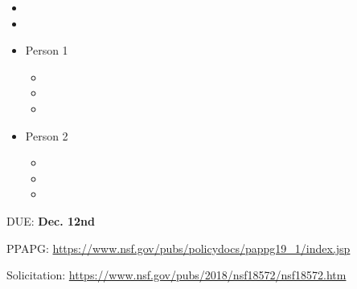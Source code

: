 \begin{itemize}[label={},nolistsep,itemsep=3pt]
\item {}
\item {}
\item Person 1
\begin{itemize}[label={},nolistsep,itemsep=3pt]
	\item {}
	\item {}
	\item {}
\end{itemize} %
\item Person 2
\begin{itemize}[label={},nolistsep,itemsep=3pt]
	\item {}
	\item {}
	\item {}
\end{itemize} %
\end{itemize}


\newpage



DUE: \textbf{Dec. 12nd}

PPAPG: \url{https://www.nsf.gov/pubs/policydocs/pappg19_1/index.jsp}

Solicitation: \url{https://www.nsf.gov/pubs/2018/nsf18572/nsf18572.htm}





